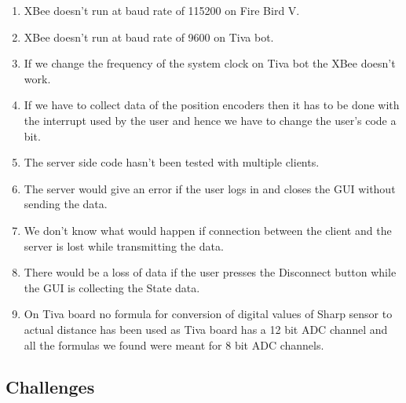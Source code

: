 \documentclass[a4paper,12pt,oneside]{book}
\begin{document}
\begin{enumerate}

\item XBee doesn't run at baud rate of 115200 on Fire Bird V.
\item XBee doesn't run at baud rate of 9600 on Tiva bot.
\item If we change the frequency of the system clock on Tiva bot the XBee doesn't work.
\item If we have to collect data of the position encoders then it has to be done with the interrupt used by the user and hence we have to change the user's code a bit.
\item The server side code hasn't been tested with multiple clients.
\item The server would give an error if the user logs in and closes the GUI without sending the data.
\item We don't know what would happen if connection between the client and the server is lost while transmitting the data.
\item There would be a loss of data if the user presses the Disconnect button while the GUI is collecting the State data.
\item On Tiva board no formula for conversion of digital values of Sharp sensor to actual distance has been used as Tiva board has a 12 bit ADC channel and all the formulas we found were meant for 8 bit ADC channels.

\end{enumerate}

\subsection{Challenges}
\end{document}
